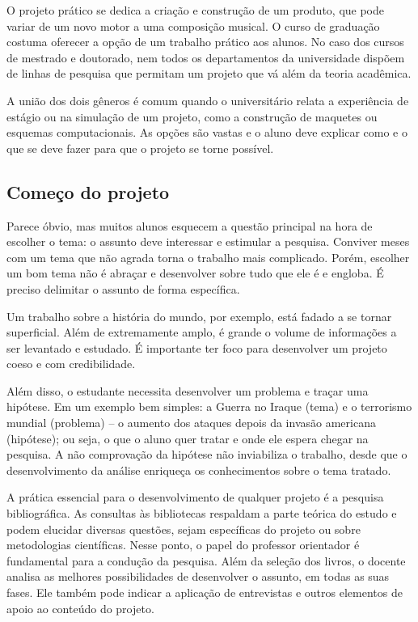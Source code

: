 O projeto prático se dedica a criação e construção de um produto, que pode variar de um novo motor a uma composição musical. O curso de graduação costuma oferecer a opção de um trabalho prático aos alunos. No caso dos cursos de mestrado e doutorado, nem todos os departamentos da universidade dispõem de linhas de pesquisa que permitam um projeto que vá além da teoria acadêmica.

A união dos dois gêneros é comum quando o universitário relata a experiência de estágio ou na simulação de um projeto, como a construção de maquetes ou esquemas computacionais. As opções são vastas e o aluno deve explicar como e o que se deve fazer para que o projeto se torne possível.

\subsection{Começo do projeto}
Parece óbvio, mas muitos alunos esquecem a questão principal na hora de escolher o tema: o assunto deve interessar e estimular a pesquisa. Conviver meses com um tema que não agrada torna o trabalho mais complicado. Porém, escolher um bom tema não é abraçar e desenvolver sobre tudo que ele é e engloba. É preciso delimitar o assunto de forma específica.

Um trabalho sobre a história do mundo, por exemplo, está fadado a se tornar superficial. Além de extremamente amplo, é grande o volume de informações a ser levantado e estudado. É importante ter foco para desenvolver um projeto coeso e com credibilidade.

Além disso, o estudante necessita desenvolver um problema e traçar uma hipótese. Em um exemplo bem simples: a Guerra no Iraque (tema) e o terrorismo mundial (problema) – o aumento dos ataques depois da invasão americana (hipótese); ou seja, o que o aluno quer tratar e onde ele espera chegar na pesquisa. A não comprovação da hipótese não inviabiliza o trabalho, desde que o desenvolvimento da análise enriqueça os conhecimentos sobre o tema tratado.

A prática essencial para o desenvolvimento de qualquer projeto é a pesquisa bibliográfica. As consultas às bibliotecas respaldam a parte teórica do estudo e podem elucidar diversas questões, sejam específicas do projeto ou sobre metodologias científicas. Nesse ponto, o papel do professor orientador é fundamental para a condução da pesquisa. Além da seleção dos livros, o docente analisa as melhores possibilidades de desenvolver o assunto, em todas as suas fases. Ele também pode indicar a aplicação de entrevistas e outros elementos de apoio ao conteúdo do projeto.

